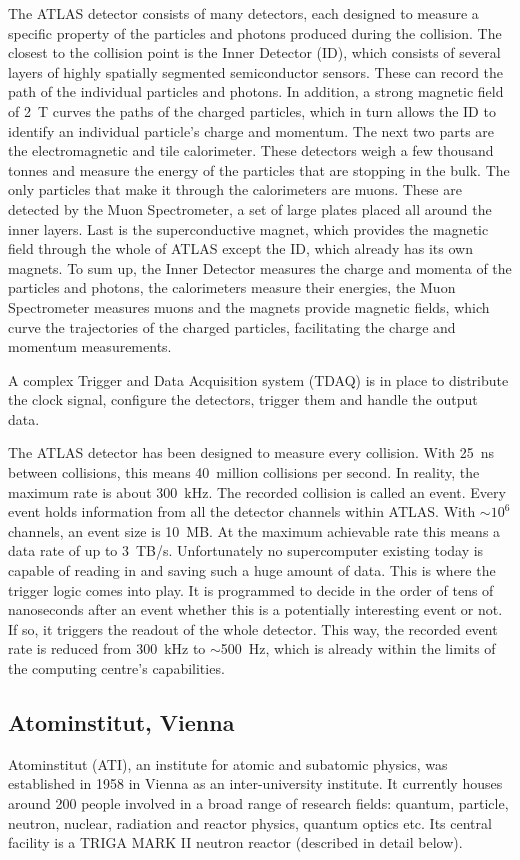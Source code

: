 \documentclass[twoside,12pt]{packages/mytustyle}  %
\begin{document}
The ATLAS detector consists of many detectors, each designed to measure a specific property of the particles and photons produced during the collision. The closest to the collision point is the Inner Detector (ID), which consists of several layers of highly spatially segmented semiconductor sensors. These can record the path of the individual particles and photons. In addition, a strong magnetic field of 2~T curves the paths of the charged particles, which in turn allows the ID to identify an individual particle's charge and momentum. The next two parts are the electromagnetic and tile calorimeter. These detectors weigh a few thousand tonnes and measure the energy of the particles that are stopping in the bulk. The only particles that make it through the calorimeters are muons. These are detected by the Muon Spectrometer, a set of large plates placed all around the inner layers. Last is the superconductive magnet, which provides the magnetic field through the whole of ATLAS except the ID, which already has its own magnets. To sum up, the Inner Detector measures the charge and momenta of the particles and photons, the calorimeters measure their energies, the Muon Spectrometer measures muons and the magnets provide magnetic fields, which curve the trajectories of the charged particles, facilitating the charge and momentum measurements.

A complex Trigger and Data Acquisition system (TDAQ) is in place to distribute the clock signal, configure the detectors, trigger them and handle the output data.

The ATLAS detector has been designed to measure every collision. With 25~ns between collisions, this means 40~million collisions per second. In reality, the maximum rate is about 300~kHz. The recorded collision is called an event. Every event holds information from all the detector channels within ATLAS. With $\sim$$10^6$ channels, an event size is 10~MB. At the maximum achievable rate this means a data rate of up to 3~TB/s. Unfortunately no supercomputer existing today is capable of reading in and saving such a huge amount of data. This is where the trigger logic comes into play. It is programmed to decide in the order of tens of nanoseconds after an event whether this is a potentially interesting event or not. If so, it triggers the readout of the whole detector. This way, the recorded event rate is reduced from 300~kHz to $\sim$500~Hz, which is already within the limits of the computing centre's capabilities.


\subsection{Atominstitut, Vienna}
Atominstitut (ATI), an institute for atomic and subatomic physics, was established in 1958 in Vienna as an inter-university institute. It currently houses around 200 people involved in a broad range of research fields: quantum, particle, neutron, nuclear, radiation and reactor physics, quantum optics etc. Its central facility is a TRIGA MARK II neutron reactor (described in detail below). 
\end{document}
